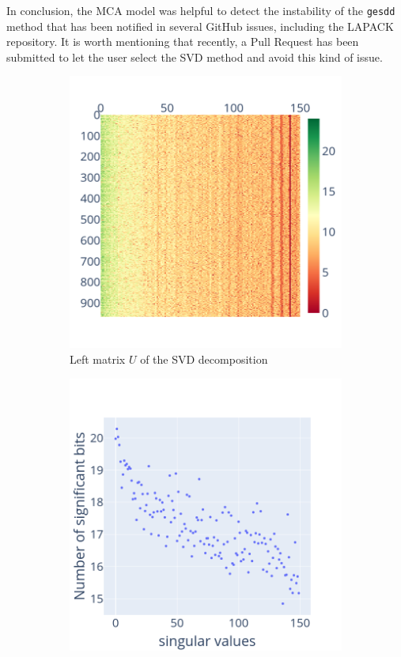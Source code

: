 \documentclass[11pt]{article}
\begin{document}
In conclusion, the MCA model was helpful to detect the instability of the \texttt{gesdd} method that has been notified in several GitHub issues, including the LAPACK repository. It is worth mentioning that recently, a Pull Request has been submitted to let the user select the SVD method and avoid this kind of issue.

\begin{figure}
    \centering
    \begin{subfigure}{0.3\linewidth}
    \includegraphics[width=\linewidth]{figure/face_recognition/randomized_svd_ret_U_sig_zoom.png}
    \caption{Left matrix $U$ of the SVD decomposition}
    \label{fig:randomized_svd_U}
    \end{subfigure}
    \begin{subfigure}{0.3\linewidth}
    \includegraphics[width=\linewidth]{figure/face_recognition/randomized_svd_ret_S_sig.png}

\end{subfigure}
\end{figure}
\end{document}
